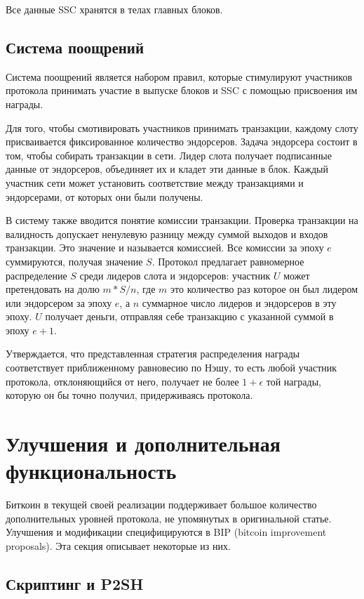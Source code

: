 \documentclass[]{itmo-student-thesis}
\begin{document}
Все данные SSC хранятся в телах главных блоков.

\subsection{Система поощрений}

Система поощрений является набором правил, которые стимулируют
участников протокола принимать участие в выпуске блоков и SSC с
помощью присвоения им награды.

Для того, чтобы смотивировать участников принимать транзакции, каждому
слоту присваивается фиксированное количество эндорсеров. Задача
эндорсера состоит в том, чтобы собирать транзакции в сети. Лидер слота
получает подписанные данные от эндорсеров, объединяет их и кладет эти
данные в блок. Каждый участник сети может установить соответствие
между транзакциями и эндорсерами, от которых они были получены.

В систему также вводится понятие комиссии транзакции. Проверка
транзакции на валидность допускает ненулевую разницу между суммой
выходов и входов транзакции. Это значение и называется комиссией. Все
комиссии за эпоху $e$ суммируются, получая значение $S$. Протокол
предлагает равномерное распределение $S$ среди лидеров слота и
эндорсеров: участник $U$ может претендовать на долю $m * S / n$, где
$m$ это количество раз которое он был лидером или эндорсером за эпоху
$e$, а $n$ суммарное число лидеров и эндорсеров в эту эпоху. $U$
получает деньги, отправляя себе транзакцию с указанной суммой в эпоху
$e+1$.

Утверждается, что представленная стратегия распределения награды
соответствует приближенному равновесию по Нэшу, то есть любой участник
протокола, отклоняющийся от него, получает не более $1 + \epsilon$ той
награды, которую он бы точно получил, придерживаясь протокола.

\section{Улучшения и дополнительная функциональность}

Биткоин в текущей своей реализации поддерживает большое количество
дополнительных уровней протокола, не упомянутых в оригинальной
статье. Улучшения и модификации специфицируются в BIP (bitcoin
improvement proposals). Эта секция описывает некоторые из них.

\subsection{Скриптинг и P2SH}
\end{document}
